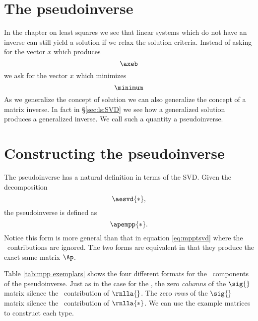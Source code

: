 \section{The pseudoinverse}

In the chapter on least squares we see that linear systems which do not have an inverse can still yield a solution if we relax the solution criteria. Instead of asking for the vector $x$ which produces
\begin{equation*}
  \axeb
\end{equation*}
we ask for the vector $x$ which minimizes
\begin{equation}
  \minimum
\end{equation}
As we generalize the concept of solution we can also generalize the concept of a matrix inverse. In fact in \S \eqref{sec:ls:SVD} we see how a generalized solution produces a generalized inverse. We call such a quantity a pseudoinverse.

\section{Constructing the pseudoinverse}
The pseudoinverse has a natural definition in terms of the SVD. Given the decomposition
\begin{equation*}
  \aesvd{*},
\end{equation*}
the pseudoinverse is defined as
\begin{equation}
  \apempp{*}.
\end{equation}
Notice this form is more general than that in equation \eqref{eq:mpptsvd} where the \ns \ contributions are ignored. The two forms are equivalent in that they produce the exact same matrix $\Ap$.

Table \eqref{tab:mpp exemplars} shows the four different formats for the \ns \ components of the pseudoinverse. Just as in the case for the \asvd, the zero \emph{columns} of the $\sig{}$ matrix silence the \ns \ contribution of $\rnlla{}$. The zero \emph{rows} of the $\sig{}$ matrix silence the \ns \ contribution of $\rnlla{*}$. We can use the example matrices to construct each type.








\endinput